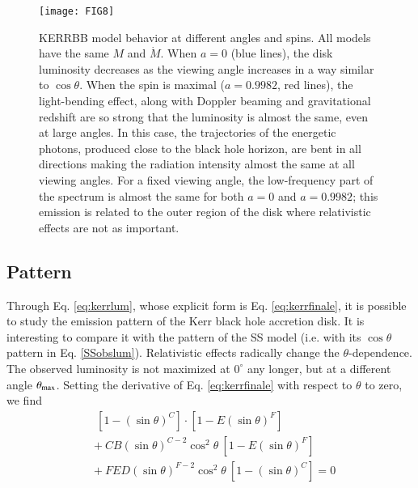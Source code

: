 \documentclass{aa}
\begin{document}
\begin{figure}
\centering
\texttt{[image: FIG8]}
\caption{
KERRBB model behavior at different angles and spins. All models have the same $M$ and $\dot{M}$. When $a = 0$ (blue lines), the disk luminosity decreases as the viewing angle increases in a way similar to $\cos \theta$. When the spin is maximal ($a = 0.9982$, red lines), the light-bending effect, along with Doppler beaming and gravitational redshift are so strong that the luminosity is almost the same, even at large angles. In this case, the trajectories of the energetic photons, produced close to the black hole horizon, are bent in all directions making the radiation intensity almost the same at all viewing angles. For a fixed viewing angle, the low-frequency part of the spectrum is almost the same for both $a=0$ and $a=0.9982$; this emission is related to the outer region of the disk where relativistic effects are not as important.   
\label{fig:spinang}}
\end{figure}










\subsection{Pattern} \label{subsec:pat}

Through Eq. \eqref{eq:kerrlum}, whose explicit form is Eq. \eqref{eq:kerrfinale}, it is possible to study the emission pattern of the Kerr black hole accretion disk. It is interesting to compare it with the pattern of the SS model (i.e. with its $\cos\theta$ pattern in Eq. \eqref{SSobslum}). Relativistic effects radically change the $\theta$-dependence. The observed luminosity is not maximized at $0^{\circ}$ any longer, but at a different angle $\theta_{\rm max}$. Setting the derivative of Eq. \eqref{eq:kerrfinale} with respect to $\theta$ to zero, we find
	\begin{equation} \label{eq:deriv}
		\begin{split}
		&\ [1 - (\sin \theta)^C] \cdot [1 - E (\sin \theta)^F] \\
		&+\ C B  (\sin \theta)^{C-2} \cos^2 \theta\ [1 - E (\sin \theta)^F] \\
		&+\ FED (\sin \theta)^{F-2} \cos^2 \theta\ [1 - (\sin \theta)^C]  = 0
		\end{split}
	\end{equation}
\end{document}
